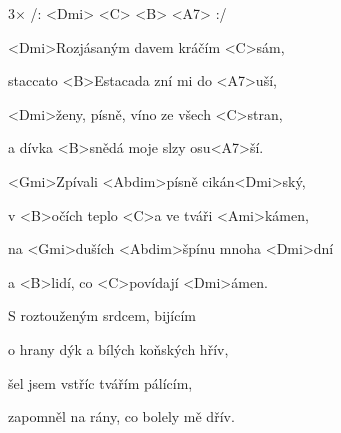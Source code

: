 

3× /: <Dmi> <C> <B> <A7> :/

\zs
<Dmi>Rozjásaným davem kráčím <C>sám,

staccato <B>Estacada zní mi do <A7>uší,

<Dmi>ženy, písně, víno ze všech <C>stran,

a dívka <B>snědá moje slzy osu<A7>ší.
\ks

\zr
<Gmi>Zpívali <Abdim>písně cikán<Dmi>ský,

v <B>očích teplo <C>a ve tváři <Ami>kámen,

na <Gmi>duších <Abdim>špínu mnoha <Dmi>dní

a <B>lidí, co <C>povídají <Dmi>ámen.
\kr

\zs
S roztouženým srdcem, bijícím

o hrany dýk a bílých koňských hřív,

šel jsem vstříc tvářím pálícím,

zapomněl na rány, co bolely mě dřív.
\ks

\zr\kr

\kp
